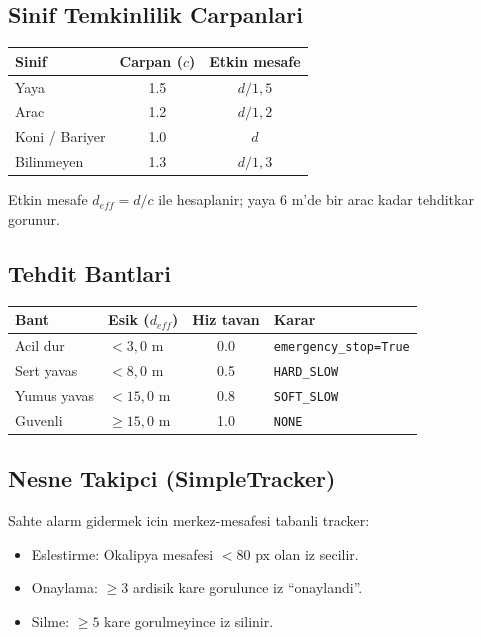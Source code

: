 \documentclass[a4paper,12pt]{article}
\begin{document}
\subsection{Sinif Temkinlilik Carpanlari}

\begin{center}
\begin{tabular}{lcc}
  \toprule
  Sinif            & Carpan ($c$) & Etkin mesafe\\
  \midrule
  Yaya             & 1.5          & $d / 1{,}5$\\
  Arac             & 1.2          & $d / 1{,}2$\\
  Koni / Bariyer   & 1.0          & $d$\\
  Bilinmeyen       & 1.3          & $d / 1{,}3$\\
  \bottomrule
\end{tabular}
\end{center}

Etkin mesafe $d_{eff} = d / c$ ile hesaplanir; yaya 6 m'de bir arac kadar
tehditkar gorunur.

\subsection{Tehdit Bantlari}

\begin{center}
\begin{tabular}{llcl}
  \toprule
  Bant        & Esik ($d_{eff}$)     & Hiz tavan & Karar\\
  \midrule
  Acil dur    & $< 3{,}0$ m           & 0.0        & \texttt{emergency\_stop=True}\\
  Sert yavas  & $< 8{,}0$ m           & 0.5        & \texttt{HARD\_SLOW}\\
  Yumus yavas & $< 15{,}0$ m          & 0.8        & \texttt{SOFT\_SLOW}\\
  Guvenli     & $\geq 15{,}0$ m       & 1.0        & \texttt{NONE}\\
  \bottomrule
\end{tabular}
\end{center}

\subsection{Nesne Takipci (SimpleTracker)}

Sahte alarm gidermek icin merkez-mesafesi tabanli tracker:

\begin{itemize}
  \item Eslestirme: Okalipya mesafesi $< 80$ px olan iz secilir.
  \item Onaylama: $\geq 3$ ardisik kare gorulunce iz ``onaylandi''.
  \item Silme: $\geq 5$ kare gorulmeyince iz silinir.
\end{itemize}
\end{document}
